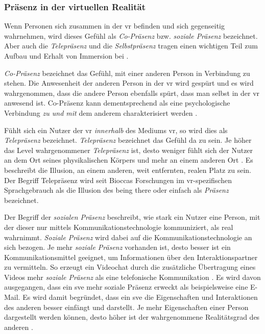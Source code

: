 \documentclass[a4paper,11pt]{article}%
\renewcommand{\\}{\vspace*{0.5\baselineskip} \newline}
\begin{document}
		\subsubsection{Präsenz in der virtuellen Realität}
Wenn Personen sich zusammen in der \ac{vr} befinden und sich gegenseitig wahrnehmen, wird dieses Gefühl als \textit{Co-Präsenz} bzw. \textit{soziale Präsenz} bezeichnet. Aber auch die \textit{Telepräsenz} und die \textit{Selbstpräsenz} tragen einen wichtigen Teil zum Aufbau und Erhalt von Immersion bei \citep{schuemie2001research}.

\textit{Co-Präsenz} bezeichnet das Gefühl, mit einer anderen Person in Verbindung zu stehen.
Die Anwesenheit der anderen Person in der \ac{vr} wird gespürt und es wird wahrgenommen, dass die andere Person ebenfalls spürt, dass man selbst in der \ac{vr} anwesend ist. 
Co-Präsenz kann dementsprechend als eine psychologische Verbindung \textit{zu und mit} dem anderem charakterisiert werden \citep[S. 179-182]{ijsselsteijn2001presence}.

Fühlt sich ein Nutzer der \ac{vr} \textit{innerhalb} des Mediums \ac{vr}, so wird dies als \textit{Telepräsenz} bezeichnet. \textit{Telepräsenz} bezeichnet das Gefühl \glqq{}da zu sein\dq{}. Je höher das Level wahrgenommener \textit{Telepräsenz} ist, desto weniger fühlt sich der Nutzer an dem Ort seines physikalischen Körpers und mehr an einem anderen Ort \citep[S. 482]{nowak2003effect}. Es beschreibt die Illusion, an einem anderen, weit entfernten, realen Platz zu sein. Der Begriff Telepräsenz wird seit Bioccas Forschungen \cite[S.12]{biocca1999cyborg} im \ac{vr}-spezifischen Sprachgebrauch als die Illusion des \glqq{}being there\dq{} oder einfach als \textit{Präsenz} bezeichnet.

Der Begriff der \textit{sozialen Präsenz} beschreibt, wie stark ein Nutzer eine Person, mit der dieser nur mittels Kommunikationstechnologie kommuniziert, als \glqq{}real\dq{} wahrnimmt. \textit{Soziale Präsenz} wird dabei auf die Kommunikationstechnologie an sich bezogen. Je mehr \textit{soziale Präsenz} vorhanden ist, desto besser ist ein Kommunikationsmittel geeignet, um Informationen über den Interaktionspartner zu vermitteln. So erzeugt ein Videochat durch die zusätzliche Übertragung eines Videos mehr \textit{soziale Präsenz} als eine telefonische Kommunikation \citep[S. 151]{gunawardena1995social}.
Es wird davon ausgegangen, dass ein \ac{sve} mehr soziale Präsenz erweckt als beispielsweise eine E-Mail. Es wird damit begründet, dass ein \ac{sve} die Eigenschaften und Interaktionen des anderen besser einfängt und darstellt. Je mehr Eigenschaften einer Person dargestellt werden können, desto höher ist der wahrgenommene Realitätsgrad des anderen \citep[S. 5-8]{biocca2002defining}.
\end{document}
